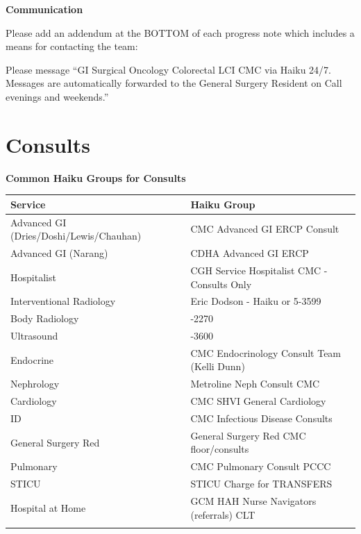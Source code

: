\documentclass[
  letterpaper,
]{scrbook}
\begin{document}
\textbf{Communication}

Please add an addendum at the BOTTOM of each progress note which
includes a means for contacting the team:

Please message ``GI Surgical Oncology Colorectal LCI CMC via Haiku 24/7.
Messages are automatically forwarded to the General Surgery Resident on
Call evenings and weekends.''

\chapter{Consults}\label{consults-2}

\textbf{Common Haiku Groups for Consults}

\begin{longtable}[]{@{}
  >{\raggedright\arraybackslash}p{}
  >{\raggedright\arraybackslash}p{}@{}}
\toprule\noalign{}
\begin{minipage}[b]{\linewidth}\raggedright
Service
\end{minipage} & \begin{minipage}[b]{\linewidth}\raggedright
Haiku Group
\end{minipage} \\
\midrule\noalign{}
\endhead
\bottomrule\noalign{}
\endlastfoot
Advanced GI (Dries/Doshi/Lewis/Chauhan) & CMC Advanced GI ERCP
Consult \\
Advanced GI (Narang) & CDHA Advanced GI ERCP \\
Hospitalist & CGH Service Hospitalist CMC - Consults Only \\
Interventional Radiology & Eric Dodson - Haiku or 5-3599 \\
Body Radiology & 5-2270 \\
Ultrasound & 5-3600 \\
Endocrine & CMC Endocrinology Consult Team (Kelli Dunn) \\
Nephrology & Metroline Neph Consult CMC \\
Cardiology & CMC SHVI General Cardiology \\
ID & CMC Infectious Disease Consults \\
General Surgery Red & General Surgery Red CMC floor/consults \\
Pulmonary & CMC Pulmonary Consult PCCC \\
STICU & STICU Charge for TRANSFERS \\
Hospital at Home & GCM HAH Nurse Navigators (referrals) CLT \\
& \\
\end{longtable}
\end{document}
